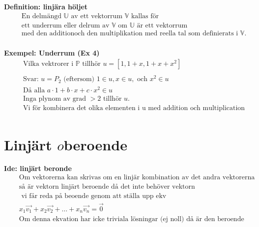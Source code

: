 \newpage

\textbf{Definition: linjära höljet}
\begin{align*}
  &\quad  \text{En delmängd $\mathbb{U}$ av ett vektorrum $\mathbb{V}$ kallas för } \\
  &\quad  \text{ett underrum eller delrum av $\mathbb{V}$ om $\mathbb{U}$ är ett vektorrum} \\
  &\quad  \text{med den additionoch den multiplikation med reella tal som definierats i
    $\mathbb{V}$.} \\
\end{align*}

\textbf{Exempel: Underrum (Ex 4)}
\begin{align*}
  &\quad  \text{Vilka vektrorer i $\mathbb{P}$ tillhör } u=[1, 1+x, 1+x+x^2] \\
  &\quad  \\
  &\quad  \text{Svar: } u=P_2 \text{ (eftersom) } 1\in{u}, x\in{u}, \text{ och } x^2\in{u} \\
  &\quad  \text{Då alla } a\cdot{1} + b\cdot{x} + c\cdot{x^2} \in{u} \\
  &\quad  \text{Inga plynom av grad $>2$ tillhör $u$.} \\
  &\quad  \text{Vi för kombinera det olika elementen i u med addition och multiplication} \\
\end{align*}

\newpage

\section{Linjärt \(o\)beroende}
\textbf{Ide: linjärt beronde}
\begin{align*}
  &\quad  \text{Om vektorerna kan skrivas om en linjär kombination av det andra vektorerna} \\
  &\quad  \text{så är vektorn linjärt beroende då det inte behöver vektorn} \\
  &\quad  \text{ vi får reda på beoende genom att ställa upp ekv} \\
  &\quad  x_1\vec{v_1}+x_2\vec{v_2} + \ldots{} + x_n\vec{v_n} = \vec{0} \\
  &\quad  \text{Om denna ekvation har icke triviala lösningar (ej noll) då är den beroende} \\
\end{align*}


